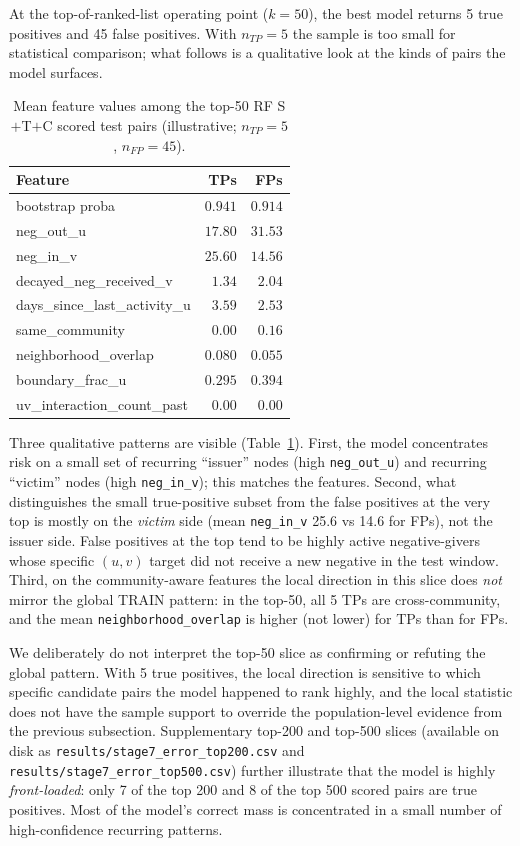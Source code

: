 \documentclass[conference]{IEEEtran}
\newcommand{\code}[1]{\texttt{#1}}
\begin{document}
At the top-of-ranked-list operating point ($k = 50$), the best model
returns 5 true positives and 45 false positives. With $n_{TP} = 5$ the
sample is too small for statistical comparison; what follows is a
qualitative look at the kinds of pairs the model surfaces.

\begin{table}[t]
\caption{Mean feature values among the top-50 RF S$+$T$+$C scored
test pairs (illustrative; $n_{TP} = 5$, $n_{FP} = 45$).}
\label{tab:top50}
\centering
\small
\begin{tabular}{lrr}
\toprule
Feature & TPs & FPs \\
\midrule
bootstrap proba              & $0.941$ & $0.914$ \\
neg\_out\_u                  & $17.80$ & $31.53$ \\
neg\_in\_v                   & $25.60$ & $14.56$ \\
decayed\_neg\_received\_v    & $1.34$  & $2.04$  \\
days\_since\_last\_activity\_u & $3.59$ & $2.53$ \\
same\_community              & $0.00$  & $0.16$  \\
neighborhood\_overlap        & $0.080$ & $0.055$ \\
boundary\_frac\_u            & $0.295$ & $0.394$ \\
uv\_interaction\_count\_past & $0.00$  & $0.00$  \\
\bottomrule
\end{tabular}
\end{table}

Three qualitative patterns are visible
(Table~\ref{tab:top50}). First, the model concentrates risk on a
small set of recurring ``issuer'' nodes (high \code{neg\_out\_u}) and
recurring ``victim'' nodes (high \code{neg\_in\_v}); this matches the
features. Second, what distinguishes the small true-positive subset
from the false positives at the very top is mostly on the
\emph{victim} side (mean \code{neg\_in\_v} 25.6 vs 14.6 for FPs), not
the issuer side. False positives at the top tend to be highly active
negative-givers whose specific $(u, v)$ target did not receive a new
negative in the test window. Third, on the community-aware features
the local direction in this slice does \emph{not} mirror the global
TRAIN pattern: in the top-50, all 5 TPs are cross-community, and the
mean \code{neighborhood\_overlap} is higher (not lower) for TPs than
for FPs.

We deliberately do not interpret the top-50 slice as confirming or
refuting the global pattern. With 5 true positives, the local
direction is sensitive to which specific candidate pairs the model
happened to rank highly, and the local statistic does not have the
sample support to override the population-level evidence from the
previous subsection. Supplementary top-200 and top-500 slices
(available on disk as \code{results/stage7\_error\_top200.csv} and
\code{results/stage7\_error\_top500.csv}) further illustrate that
the model is highly \emph{front-loaded}: only 7 of the top 200 and
8 of the top 500 scored pairs are true positives. Most of the model's
correct mass is concentrated in a small number of high-confidence
recurring patterns.
\end{document}
